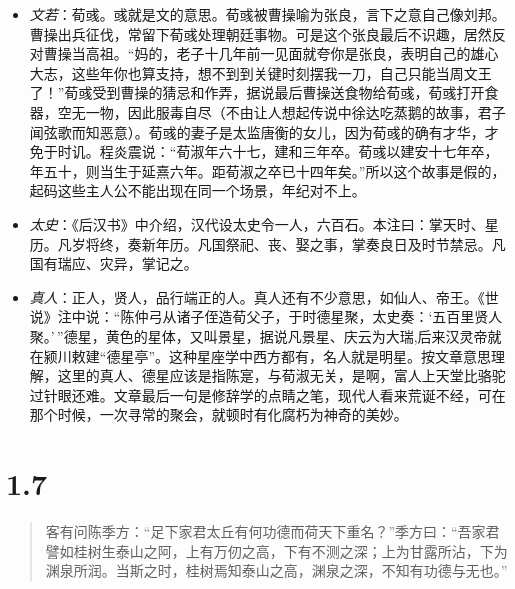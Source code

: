 \documentclass[]{book}
\begin{document}
\begin{itemize}
\item
  \emph{文若}：荀彧。彧就是文的意思。荀彧被曹操喻为张良，言下之意自己像刘邦。曹操出兵征伐，常留下荀彧处理朝廷事物。可是这个张良最后不识趣，居然反对曹操当高祖。``妈的，老子十几年前一见面就夸你是张良，表明自己的雄心大志，这些年你也算支持，想不到到关键时刻摆我一刀，自己只能当周文王了！''荀彧受到曹操的猜忌和作弄，据说最后曹操送食物给荀彧，荀彧打开食器，空无一物，因此服毒自尽（不由让人想起传说中徐达吃蒸鹅的故事，君子闻弦歌而知恶意）。荀彧的妻子是太监唐衡的女儿，因为荀彧的确有才华，才免于时讥。程炎震说：``荀淑年六十七，建和三年卒。荀彧以建安十七年卒，年五十，则当生于延熹六年。距荀淑之卒已十四年矣。''所以这个故事是假的，起码这些主人公不能出现在同一个场景，年纪对不上。
\item
  \emph{太史}：《后汉书》中介绍，汉代设太史令一人，六百石。本注曰：掌天时、星历。凡岁将终，奏新年历。凡国祭祀、丧、娶之事，掌奏良日及时节禁忌。凡国有瑞应、灾异，掌记之。
\item
  \emph{真人}：正人，贤人，品行端正的人。真人还有不少意思，如仙人、帝王。《世说》注中说：``陈仲弓从诸子侄造荀父子，于时德星聚，太史奏：`五百里贤人聚。'\,''德星，黄色的星体，又叫景星，据说凡景星、庆云为大瑞,后来汉灵帝就在颍川敕建``德星亭''。这种星座学中西方都有，名人就是明星。按文章意思理解，这里的真人、德星应该是指陈寔，与荀淑无关，是啊，富人上天堂比骆驼过针眼还难。文章最后一句是修辞学的点睛之笔，现代人看来荒诞不经，可在那个时候，一次寻常的聚会，就顿时有化腐朽为神奇的美妙。
\end{itemize}

\section{1.7}\label{section-6}

\begin{quote}
客有问陈季方：``足下家君太丘有何功德而荷天下重名？''季方曰：``吾家君譬如桂树生泰山之阿，上有万仞之高，下有不测之深；上为甘露所沾，下为渊泉所润。当斯之时，桂树焉知泰山之高，渊泉之深，不知有功德与无也。''
\end{quote}
\end{document}
